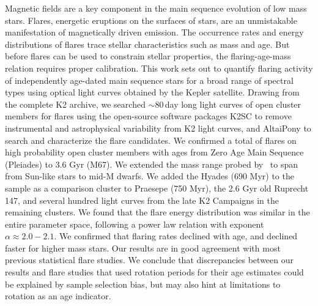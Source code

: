 \documentclass{aa}
\begin{document}
  \abstract
   {Magnetic fields are a key component in the main sequence evolution of low mass stars. Flares, energetic eruptions on the surfaces of stars, are an unmistakable manifestation of magnetically driven emission. The occurrence rates and energy distributions of flares trace stellar characteristics such as mass and age. But before flares can be used to constrain stellar properties, the flaring-age-mass relation requires proper calibration.}
   {This work sets out to quantify flaring activity of independently age-dated main sequence stars for a broad range of spectral types using optical light curves obtained by the Kepler satellite.}
   {Drawing from the complete K2 archive, we searched \unskip\;$\sim80$\,day long light curves of open cluster members for flares using the open-source software packages K2SC to remove instrumental and astrophysical variability from K2 light curves, and AltaiPony to search and characterize the flare candidates.}
   {We confirmed a total of flares on high probability open cluster members with ages from Zero Age Main Sequence (Pleiades) to 3.6 Gyr (M67). We extended the mass range probed by~\citet{ilin2019} to span from Sun-like stars to mid-M dwarfs. We added the Hyades (690 Myr) to the sample as a comparison cluster to Praesepe (750 Myr), the 2.6 Gyr old Ruprecht 147, and several hundred light curves from the late K2 Campaigns in the remaining clusters. We found that the flare energy distribution was similar in the entire parameter space, following a power law relation with exponent $\alpha\approx 2.0-2.1$. }
{We confirmed that flaring rates declined with age, and declined faster for higher mass stars. Our results are in good agreement with most previous statistical flare studies. We conclude that discrepancies between our results and flare studies that used rotation periods for their age estimates could be explained by sample selection bias, but may also hint at limitations to rotation as an age indicator.}
   \maketitle
   
\end{document}
